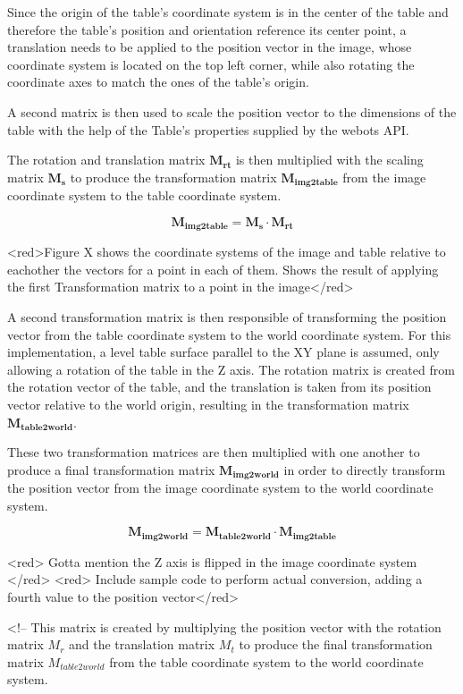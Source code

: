 Since the origin of the table's coordinate system is in the center of the table and therefore the table's position and orientation reference its center point, a translation needs to be applied to the position vector in the image, whose coordinate system is located on the top left corner, while also rotating the coordinate axes to match the ones of the table's origin.

A second matrix is then used to scale the position vector to the dimensions of the table with the help of the Table's properties supplied by the webots API.

The rotation and translation matrix $\mathbf{M_{rt}}$ is then multiplied with the scaling matrix $\mathbf{M_s}$ to produce the transformation matrix $\mathbf{M_{img2table}}$ from the image coordinate system to the table coordinate system.

$$\mathbf{M_{img2table}} = \mathbf{M_s} \cdot \mathbf{M_{rt}}$$

<red>Figure X shows the coordinate systems of the image and table relative to eachother the vectors for a point in each of them. Shows the result of applying the first Transformation matrix to a point in the image</red>


A second transformation matrix is then responsible of transforming the position vector from the table coordinate system to the world coordinate system. For this implementation, a level table surface parallel to the XY plane is assumed, only allowing a rotation of the table in the Z axis. The rotation matrix is created from the rotation vector of the table, and the translation is taken from its position vector relative to the world origin, resulting in the transformation matrix $\mathbf{M_{table2world}}$.

These two transformation matrices are then multiplied with one another to produce a final transformation matrix $\mathbf{M_{img2world}}$ in order to directly transform the position vector from the image coordinate system to the world coordinate system.

$$\mathbf{M_{img2world}} = \mathbf{M_{table2world}} \cdot \mathbf{M_{img2table}}$$



<red> Gotta mention the Z axis is flipped in the image coordinate system </red>
<red> Include sample code to perform actual conversion, adding a fourth value to the position vector</red>

<!-- 
 This matrix is created by multiplying the position vector with the rotation matrix $M_r$ and the translation matrix $M_t$ to produce the final transformation matrix $M_{table2world}$ from the table coordinate system to the world coordinate system.


